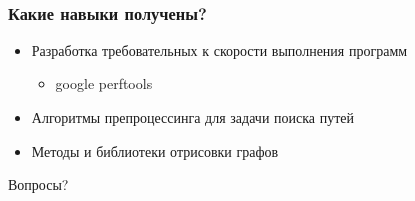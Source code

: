\documentclass[10pt, pdf,utf8,russian]{beamer}
\begin{document}
\begin{frame} 
\frametitle{Какие навыки получены?}
\begin{itemize}
	\item Разработка требовательных к скорости выполнения программ
		\begin{itemize}
			\item google perftools
		\end{itemize}
	\item Алгоритмы препроцессинга для задачи поиска путей
	\item Методы и библиотеки отрисовки графов
\end{itemize}
\end{frame}

\begin{frame}
\Huge{\centerline{Вопросы?}}
\end{frame}

\end{document}
